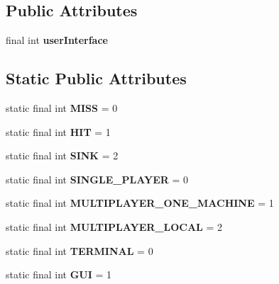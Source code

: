 \subsection*{Public Attributes}
\begin{DoxyCompactItemize}
\item 
final int {\bfseries user\+Interface}\hypertarget{classGame_a8ccbeac22c3c1dd4c9e25d958849a00b}{}\label{classGame_a8ccbeac22c3c1dd4c9e25d958849a00b}

\end{DoxyCompactItemize}
\subsection*{Static Public Attributes}
\begin{DoxyCompactItemize}
\item 
static final int {\bfseries M\+I\+SS} = 0\hypertarget{classGame_a66375c0a8f7f1a1480bd47221bc31917}{}\label{classGame_a66375c0a8f7f1a1480bd47221bc31917}

\item 
static final int {\bfseries H\+IT} = 1\hypertarget{classGame_a3840c1d15fa897a006516377a7f2e340}{}\label{classGame_a3840c1d15fa897a006516377a7f2e340}

\item 
static final int {\bfseries S\+I\+NK} = 2\hypertarget{classGame_a025eaf2e2b3235687cebe23b45f74467}{}\label{classGame_a025eaf2e2b3235687cebe23b45f74467}

\item 
static final int {\bfseries S\+I\+N\+G\+L\+E\+\_\+\+P\+L\+A\+Y\+ER} = 0\hypertarget{classGame_a5339842157512627a57fd244ddf6fee1}{}\label{classGame_a5339842157512627a57fd244ddf6fee1}

\item 
static final int {\bfseries M\+U\+L\+T\+I\+P\+L\+A\+Y\+E\+R\+\_\+\+O\+N\+E\+\_\+\+M\+A\+C\+H\+I\+NE} = 1\hypertarget{classGame_a154eba714e497a72538c02a4a242e6f0}{}\label{classGame_a154eba714e497a72538c02a4a242e6f0}

\item 
static final int {\bfseries M\+U\+L\+T\+I\+P\+L\+A\+Y\+E\+R\+\_\+\+L\+O\+C\+AL} = 2\hypertarget{classGame_a33173902f263a3da1fcc20039c5270c4}{}\label{classGame_a33173902f263a3da1fcc20039c5270c4}

\item 
static final int {\bfseries T\+E\+R\+M\+I\+N\+AL} = 0\hypertarget{classGame_a5b128fb3114228cd96da20f04a242ece}{}\label{classGame_a5b128fb3114228cd96da20f04a242ece}

\item 
static final int {\bfseries G\+UI} = 1\hypertarget{classGame_a9946b16728ee007ef31ec57e6578d2a2}{}\label{classGame_a9946b16728ee007ef31ec57e6578d2a2}

\end{DoxyCompactItemize}



